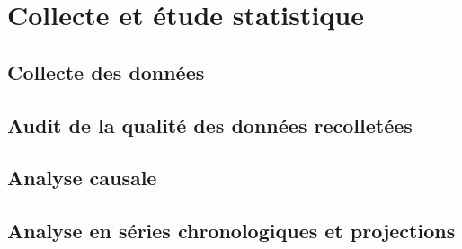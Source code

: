 \chapter{Collecte et étude statistique}

\cleardoublepage

	\section{Collecte des données}
	\section{Audit de la qualité des données recolletées}
	\section{Analyse causale}
	\section{Analyse en séries chronologiques et projections}